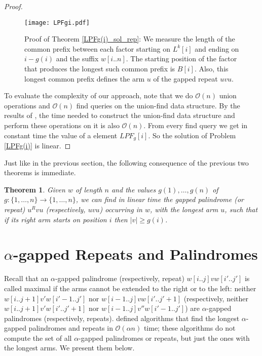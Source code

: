 \documentclass[final]{dmtcs-episciences}
\newcommand{\bigo}{{\mathcal O}}
\newcommand{\ra}{\rightarrow}
\newcommand{\LPdF}{{\mathit{LPF}}}
\newtheorem{theorem}{Theorem}
\begin{document}
\begin{proof}
\begin{figure}
\begin{center}
\texttt{[image: LPFgi.pdf]}
\end{center}
\caption{Proof of Theorem \ref{LPFg(i)_sol_rep}: We measure the length of the common prefix between each factor starting on $L^k[i]$ and ending on $i-g(i)$ and  the suffix $w[i..n]$. The starting position of the factor that produces the longest such common prefix is $B[i]$. Also, this longest common prefix defines the arm $u$ of the gapped repeat $uvu$.}
\end{figure}


To evaluate the complexity of our approach, note that we do $\bigo(n)$ union operations and $\bigo(n)$ find queries on the union-find data structure. By the results of \cite{Gabow83}, the time needed to construct the union-find data structure and perform these operations on it is also $\bigo(n)$. From every find query we get in constant time the value of a element $\LPdF_g[i]$. So the solution of Problem \ref{LPFg(i)} is linear. 
\end{proof}

Just like in the previous section, the following consequence of the previous two theorems is immediate.

\begin{theorem}
Given $w$ of length $n$ and the values $g(1),\ldots,g(n)$ of $g:\{1,\ldots,n\}\ra \{1,\ldots,n\}$, we can find in linear time the gapped palindrome (or repeat) $u^Rvu$ (respectively, $uvu$) occurring in $w$, with the longest arm $u$, such that if its right arm starts on position $i$ then $|v|\geq g(i)$. 
\end{theorem}

\section{$\alpha$-gapped Repeats and Palindromes}

Recall that an $\alpha$-gapped palindrome (respectively, repeat) $w[i..j]vw[i'..j']$ is called maximal if the arms cannot be extended to the right or to the left: neither $w[i..j+1]v'w[i'-1..j']$ nor $w[i-1..j]vw[i'..j'+1]$ (respectively, neither $w[i..j+1]v'w[i'..j'+1]$ nor $w[i-1..j]v''w[i'-1..j']$) are $\alpha$-gapped palindromes (respectively, repeats).
\cite{fct} defined algorithms that find the longest $\alpha$-gapped palindromes and repeats in $\bigo(\alpha n)$ time; these algorithms do not compute the set of all $\alpha$-gapped palindromes or repeats, but just the ones with the longest arms. We present them below.
\end{document}
